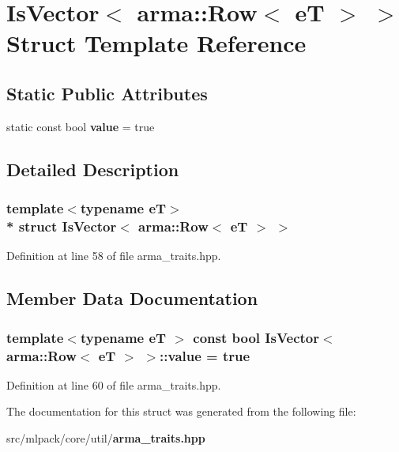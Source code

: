 \section{Is\+Vector$<$ arma\+:\+:Row$<$ eT $>$ $>$ Struct Template Reference}
\label{structIsVector_3_01arma_1_1Row_3_01eT_01_4_01_4}
\subsection*{Static Public Attributes}
\begin{DoxyCompactItemize}
\item 
static const bool {\bf value} = true
\end{DoxyCompactItemize}


\subsection{Detailed Description}
\subsubsection*{template$<$typename eT$>$\\*
struct Is\+Vector$<$ arma\+::\+Row$<$ e\+T $>$ $>$}



Definition at line 58 of file arma\+\_\+traits.\+hpp.



\subsection{Member Data Documentation}
\subsubsection[{value}]{\setlength{\rightskip}{0pt plus 5cm}template$<$typename eT $>$ const bool {\bf Is\+Vector}$<$ arma\+::\+Row$<$ eT $>$ $>$\+::value = true\hspace{0.3cm}{\ttfamily [static]}}\label{structIsVector_3_01arma_1_1Row_3_01eT_01_4_01_4_a0f839e96733edeb3d9591ac270a37f1c}


Definition at line 60 of file arma\+\_\+traits.\+hpp.



The documentation for this struct was generated from the following file\+:\begin{DoxyCompactItemize}
\item 
src/mlpack/core/util/{\bf arma\+\_\+traits.\+hpp}\end{DoxyCompactItemize}
